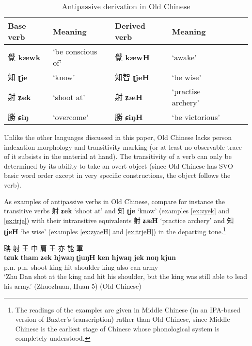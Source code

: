 \documentclass[oneside,a4paper,11pt]{article}
\newcommand{\ipa}[1]{{\phon\textbf{#1}}}
\newcommand{\zh}[1]{{\cn #1}}
\newcommand{\zhc}[2]{\zh{#1} \ipa{#2}}
\begin{document}
\begin{table}[H]
\caption{Antipassive derivation in Old Chinese} \label{tab:oc} \centering
\begin{tabular}{llllll}
\toprule
Base verb & Meaning & Derived verb & Meaning \\
\midrule
\zhc{覺}{kæwk} & `be conscious of' &  \zhc{覺}{kæwH}& `awake' \\
\zhc{知}{ʈje} & `know' &  \zhc{知智}{ʈjeH}& `be wise' \\
\zhc{射}{ʑek} & `shoot at' &  \zhc{射}{ʑæH}& `practise archery' \\
\zhc{勝}{ɕiŋ} & `overcome' &  \zhc{勝}{ɕiŋH}& `be victorious' \\
\bottomrule
\end{tabular}
\end{table}

Unlike the other languages discussed in this paper, Old Chinese lacks person indexation morphology and transitivity marking (or at least no observable trace of it subsists in the material at hand). The transitivity of a verb can only be determined by its ability to take an overt object (since Old Chinese has SVO basic word order except in very specific constructions, the object follows the verb).

As examples of antipassive verbs in Old Chinese, compare for instance the transitive verbs \zhc{射}{ʑek} `shoot at'  and \zhc{知}{ʈje}  `know'  (examples \ref{ex:zyek} and \ref{ex:trje}) with their intransitive equivalents \zhc{射}{ʑæH}  `practice archery' and  \zhc{知}{ʈjeH} `be wise' (examples \ref{ex:zyaeH} and \ref{ex:trjeH}) in the departing tone.\footnote{The readings of the examples are given in Middle Chinese (in an IPA-based version of Baxter's \citeyear{baxter92} transcription) rather than Old Chinese, since Middle Chinese is the earliest stage of Chinese whose phonological system is completely understood. }

\begin{exe}
\ex \label{ex:zyek}
\glt
\glt \zh{祝聃射王中肩，王亦能軍}  %
\glll \zh{祝} \zh{聃} \zh{射} \zh{王} \zh{中} \zh{肩} \zh{王} \zh{亦} \zh{能} \zh{軍} \\
\ipa{tɕuk} \ipa{tham} \ipa{ʑek} \ipa{hjwaŋ} \ipa{ʈjuŋH} \ipa{ken} \ipa{hjwaŋ}  \ipa{jek}   \ipa{noŋ} \ipa{kjun}     \\
p.n. p.n. shoot king hit shoulder king also can army \\
\glt `Zhu Dan shot at the king and hit his shoulder, but the king was still able to lead his army.'  (Zhuozhuan, Huan 5) (Old Chinese)
\end{exe}
\end{document}
